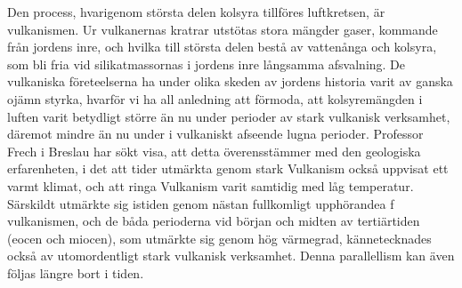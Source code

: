 \documentclass[a4paper, 12pt, oneside, swedish]{article}
\begin{document}
Den process, hvarigenom största delen kolsyra tillföres luftkretsen, är vulkanismen. Ur vulkanernas kratrar utstötas stora mängder gaser, kommande från jordens inre, och hvilka till största delen bestå av vattenånga och kolsyra, som bli fria vid silikatmassornas i jordens inre långsamma afsvalning. De vulkaniska företeelserna ha under olika skeden av jordens historia varit av ganska ojämn styrka, hvarför vi ha all anledning att förmoda, att kolsyremängden i luften varit betydligt större än nu under perioder av stark vulkanisk verksamhet, däremot mindre än nu under i vulkaniskt afseende lugna perioder. Professor Frech i Breslau har sökt visa, att detta överensstämmer med den geologiska erfarenheten, i det att tider utmärkta genom stark Vulkanism också uppvisat ett varmt klimat, och att ringa Vulkanism varit samtidig med låg temperatur. Särskildt utmärkte sig istiden genom nästan fullkomligt upphörandea f vulkanismen, och de båda perioderna vid början och midten av tertiärtiden (eocen och miocen), som utmärkte sig genom hög värmegrad, kännetecknades också av utomordentligt stark vulkanisk verksamhet. Denna parallellism kan även följas längre bort i tiden.
\end{document}
